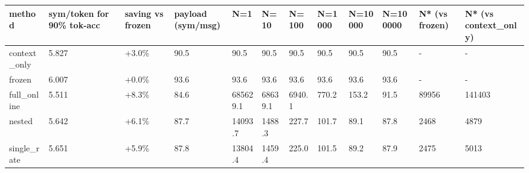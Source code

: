 \begin{tabular}{llllllllllll}
\hline
method & sym/token for 90\% tok-acc & saving vs frozen & payload (sym/msg) & N=1 & N=10 & N=100 & N=1000 & N=10000 & N=100000 & N* (vs frozen) & N* (vs context\_only) \\
\hline
context\_only & 5.827 & +3.0\% & 90.5 & 90.5 & 90.5 & 90.5 & 90.5 & 90.5 & 90.5 & - & - \\
frozen & 6.007 & +0.0\% & 93.6 & 93.6 & 93.6 & 93.6 & 93.6 & 93.6 & 93.6 & - & - \\
full\_online & 5.511 & +8.3\% & 84.6 & 685629.1 & 68639.1 & 6940.1 & 770.2 & 153.2 & 91.5 & 89956 & 141403 \\
nested & 5.642 & +6.1\% & 87.7 & 14093.7 & 1488.3 & 227.7 & 101.7 & 89.1 & 87.8 & 2468 & 4879 \\
single\_rate & 5.651 & +5.9\% & 87.8 & 13804.4 & 1459.4 & 225.0 & 101.5 & 89.2 & 87.9 & 2475 & 5013 \\
\hline
\end{tabular}

